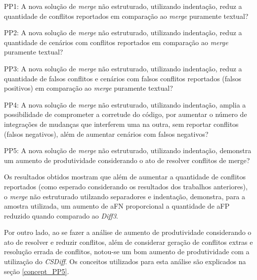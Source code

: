 \begin{compactenum}[1)]
	\item PP1: A nova solução de \emph{merge} não estruturado, utilizando indentação,
	reduz a quantidade de conflitos reportados em comparação ao \emph{merge} puramente textual?
	\item PP2: A nova solução de \emph{merge} não estruturado, utilizando indentação,
	reduz a quantidade de cenários com conflitos reportados em comparação ao \emph{merge} puramente textual?
	\item PP3: A nova solução de \emph{merge} não estruturado, utilizando indentação,
	reduz a quantidade de falsos conflitos e cenários com falsos conflitos reportados
	(falsos positivos) em comparação ao \emph{merge} puramente textual?
	\item PP4: A nova solução de \emph{merge} não estruturado, utilizando indentação,
	amplia a possibilidade de comprometer a corretude do código, por aumentar o número de
	integrações de mudanças que interferem uma na outra, sem reportar conflitos (falsos negativos),
	além de aumentar cenários com falsos negativos?
	\item PP5: A nova solução de \emph{merge} não estruturado, utilizando indentação,
	demonstra um aumento de produtividade considerando o ato de resolver conflitos de merge?
\end{compactenum}

Os resultados obtidos mostram que além de aumentar a quantidade de conflitos reportados
(como esperado considerando os resultados dos trabalhos anteriores),
o \emph{merge} não estruturado utilzando separadores e indentação, demonstra, para a amostra utilizada,
um aumento de aFN proporcional a quantidade de aFP reduzido quando comparado ao \emph{Diff3}. 

Por outro lado, ao se fazer a análise de aumento de produtividade considerando o ato de resolver e reduzir conflitos,
além de considerar geração de conflitos extras e resolução errada de conflitos, notou-se um bom aumento
de produtividade com a utilização do \emph{CSDiff}. Os conceitos utilizados para esta análise
são explicados na seção \ref{concept_PP5}.

